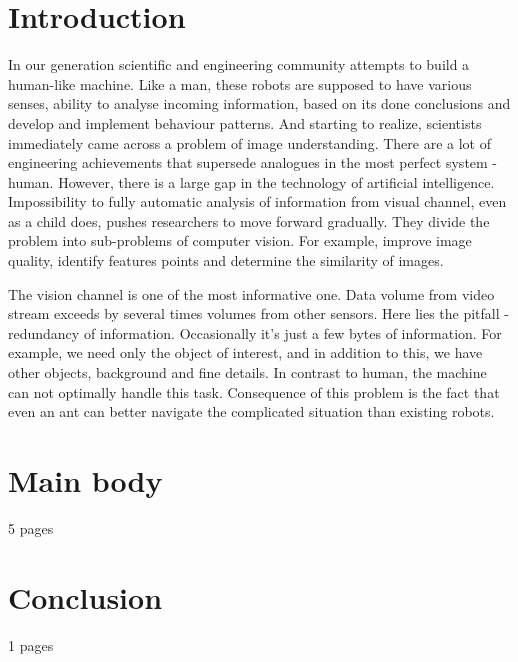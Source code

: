 \documentclass[12pt,a4paper,oneside,titlepage]{article}
\begin{document}
\section*{Introduction}
In our generation scientific and engineering community attempts to build a human-like machine.
Like a man, these robots are supposed to have various senses, ability to analyse incoming information, based on its done conclusions and develop and implement behaviour patterns.
And starting to realize, scientists immediately came across a problem of image understanding.
There are a lot of engineering achievements that supersede analogues in the most perfect system - human.
However, there is a large gap in the technology of artificial intelligence.
Impossibility to fully automatic analysis of information from visual channel, even as a child does, pushes researchers to move forward gradually.
They divide the problem into sub-problems of computer vision. 
For example, improve image quality, identify features points and determine the similarity of images.

The vision channel is one of the most informative one.
Data volume from video stream exceeds by several times volumes from other sensors.
Here lies the pitfall - redundancy of information.
Occasionally it's just a few bytes of information.
For example, we need only the object of interest, and in addition to this, we have other objects, background and fine details.
In contrast to human, the machine can not optimally handle this task.
Consequence of this problem is the fact that even an ant can better navigate the complicated situation than existing robots.

\newpage
\section*{Main body}
5 pages

\newpage
\section*{Conclusion}
1 pages
%


\newpage
\renewcommand\refname{Bibliography}


\end{document}
